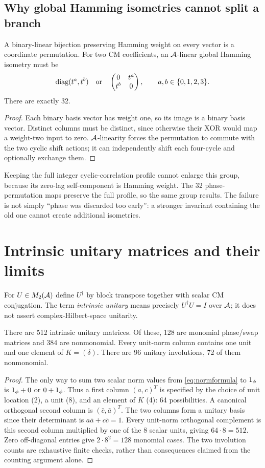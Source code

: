 \subsection{Why global Hamming isometries cannot split a branch}
\begin{proposition}\label{prop:hamming}
A binary-linear bijection preserving Hamming weight on every vector is a coordinate permutation. For two CM coefficients, an $\mathcal A$-linear global Hamming isometry must be
\begin{equation}
 \operatorname{diag}(t^a,t^b)\quad\text{or}\quad
 \begin{pmatrix}0&t^a\\t^b&0\end{pmatrix},\qquad a,b\in\{0,1,2,3\}.
\end{equation}
There are exactly 32.
\end{proposition}
\begin{proof}
Each binary basis vector has weight one, so its image is a binary basis vector. Distinct columns must be distinct, since otherwise their XOR would map a weight-two input to zero. $\mathcal A$-linearity forces the permutation to commute with the two cyclic shift actions; it can independently shift each four-cycle and optionally exchange them.
\end{proof}
Keeping the full integer cyclic-correlation profile cannot enlarge this group, because its zero-lag self-component is Hamming weight. The 32 phase-permutation maps preserve the full profile, so the same group results. The failure is not simply ``phase was discarded too early'': a stronger invariant containing the old one cannot create additional isometries.

\section{Intrinsic unitary matrices and their limits}\label{sec:unitary}
For $U\in M_2(\mathcal A)$ define $U^\dagger$ by block transpose together with scalar CM conjugation. The term \emph{intrinsic unitary} means precisely $U^\dagger U=I$ over $\mathcal A$; it does not assert complex-Hilbert-space unitarity.

\begin{theorem}\label{thm:unitaries}
There are 512 intrinsic unitary matrices. Of these, 128 are monomial phase/swap matrices and 384 are nonmonomial. Every unit-norm column contains one unit and one element of $K=(\delta)$. There are 96 unitary involutions, 72 of them nonmonomial.
\end{theorem}
\begin{proof}
The only way to sum two scalar norm values from \cref{eq:normformula} to $1_{\phi}$ is $1_{\phi}+0$ or $0+1_{\phi}$. Thus a first column $(a,c)^T$ is specified by the choice of unit location (2), a unit (8), and an element of $K$ (4): 64 possibilities. A canonical orthogonal second column is $(\bar c,\bar a)^T$. The two columns form a unitary basis since their determinant is $a\bar a+c\bar c=1$. Every unit-norm orthogonal complement is this second column multiplied by one of the 8 scalar units, giving $64\cdot8=512$. Zero off-diagonal entries give $2\cdot8^2=128$ monomial cases. The two involution counts are exhaustive finite checks, rather than consequences claimed from the counting argument alone.
\end{proof}

